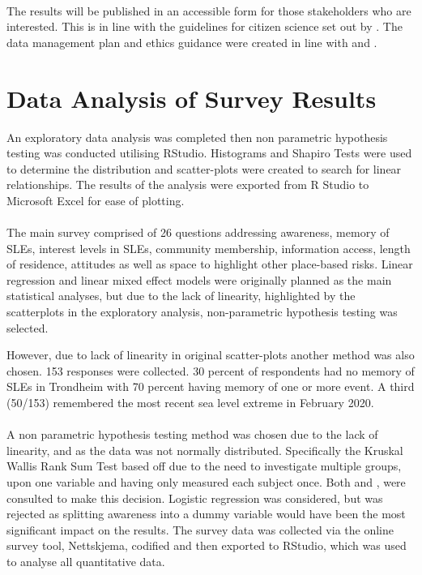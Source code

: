 \paragraph{}
The results will be published in an accessible form for those stakeholders who are interested. This is in line with the guidelines for citizen science set out by \cite{tweddle_guide_2012}. The data management plan and ethics guidance were created in line with \cite{nesh_guidelines_2022} and \cite{nsd_norsk_nodate}. 

\section{Data Analysis of Survey Results}
An exploratory data analysis was completed then non parametric hypothesis testing was conducted utilising RStudio. Histograms and Shapiro Tests were used to determine the distribution and scatter-plots were created to search for linear relationships. The results of the analysis were exported from R Studio to Microsoft Excel for ease of plotting.
\paragraph{}
The main survey comprised of 26 questions addressing awareness, memory of SLEs, interest levels in SLEs, community membership, information access, length of residence, attitudes as well as space to highlight other place-based risks. Linear regression and linear mixed effect models were originally planned as the main statistical analyses, but due to the lack of linearity, highlighted by the scatterplots in the exploratory analysis, non-parametric hypothesis testing was selected.


However, due to lack of linearity in original scatter-plots another method was also chosen. 153 responses were collected. 30 percent of respondents had no memory of SLEs in Trondheim with 70 percent having memory of one or more event. A third (50/153) remembered the most recent sea level extreme in February 2020. 
\paragraph{}
A non parametric hypothesis testing method was chosen due to the lack of linearity, and as the data was not normally distributed. Specifically the Kruskal Wallis Rank Sum Test based off \cite{hollander_nonparametric_2014} due to the need to investigate multiple groups, upon one variable and having only measured each subject once. Both \cite{tasman_how_2014} and \cite{hollander_nonparametric_2014}, were consulted to make this decision. Logistic regression was considered, but was rejected as splitting awareness into a dummy variable would have been the most significant impact on the results. The survey data was collected via the online survey tool, Nettskjema, codified and then exported to RStudio, which was used to analyse all quantitative data.
